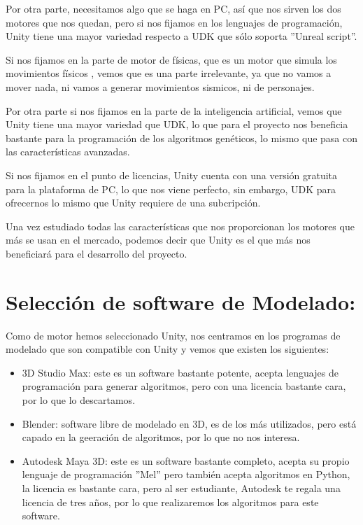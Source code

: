 Por otra parte, necesitamos algo que se haga en PC, así que nos sirven los dos motores que nos quedan, pero si nos fijamos en los lenguajes de programación, Unity tiene una mayor variedad respecto a UDK que sólo soporta ''Unreal script''.

Si nos fijamos en la parte de motor de físicas, que es un motor que simula los movimientos físicos \cite{B11}, vemos que es una parte irrelevante, ya que no vamos a mover nada, ni vamos a generar movimientos sismicos, ni de personajes.

Por otra parte si nos fijamos en la parte de la inteligencia artificial, vemos que Unity tiene una mayor variedad que UDK, lo que para el proyecto nos beneficia bastante para la programación de los algoritmos genéticos, lo mismo que pasa con las características avanzadas.

Si nos fijamos en el punto de licencias, Unity cuenta con una versión gratuita para la plataforma de PC, lo que nos viene perfecto, sin embargo, UDK para ofrecernos lo mismo que Unity requiere de una subcripción.

Una vez estudiado todas las características que nos proporcionan los motores que más se usan en el mercado, podemos decir que Unity es el que más nos beneficiará para el desarrollo del proyecto.

\section{Selección de software de Modelado:}

Como de motor hemos seleccionado Unity, nos centramos en los programas de modelado que son compatible con Unity y vemos que existen los siguientes:

\begin{itemize}
	\item 3D Studio Max: este es un software bastante potente, acepta lenguajes de programación para generar algoritmos, pero con una licencia bastante cara, por lo que lo descartamos.
	\item Blender: software libre de modelado en 3D, es de los más utilizados, pero está capado en la geeración de algoritmos, por lo que no nos interesa.
	\item Autodesk Maya 3D: este es un software bastante completo, acepta su propio lenguaje de programación ''Mel'' pero también acepta algoritmos en Python, la licencia es bastante cara, pero al ser estudiante, Autodesk te regala una licencia de tres años, por lo que realizaremos los algoritmos para este software.
\end{itemize}

